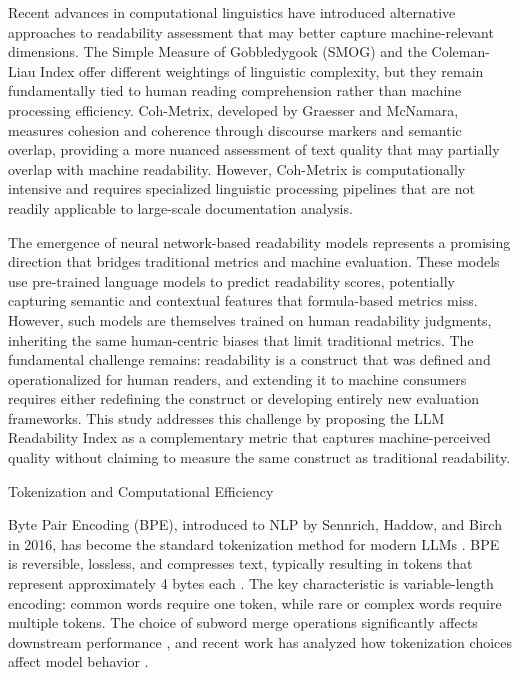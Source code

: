 \documentclass[10pt,conference,a4paper]{IEEEtran}
\makeatletter
\let\oldsubsection\subsection
\renewcommand{\subsection}{%
    \@ifstar{\subsectionStar}{\subsectionNoStar}%
}
\newcommand{\subsectionStar}[1]{%
    \oldsubsection*{\textit{#1}}%
    \vspace{-3pt}%
}
\newcommand{\subsectionNoStar}[1]{%
    \oldsubsection{\textit{#1}}%
    \vspace{-3pt}%
}
\makeatother
\begin{document}
Recent advances in computational linguistics have introduced alternative approaches to readability assessment that may better capture machine-relevant dimensions. The Simple Measure of Gobbledygook (SMOG) and the Coleman-Liau Index offer different weightings of linguistic complexity, but they remain fundamentally tied to human reading comprehension rather than machine processing efficiency. Coh-Metrix, developed by Graesser and McNamara, measures cohesion and coherence through discourse markers and semantic overlap, providing a more nuanced assessment of text quality that may partially overlap with machine readability. However, Coh-Metrix is computationally intensive and requires specialized linguistic processing pipelines that are not readily applicable to large-scale documentation analysis.

The emergence of neural network-based readability models represents a promising direction that bridges traditional metrics and machine evaluation. These models use pre-trained language models to predict readability scores, potentially capturing semantic and contextual features that formula-based metrics miss. However, such models are themselves trained on human readability judgments, inheriting the same human-centric biases that limit traditional metrics. The fundamental challenge remains: readability is a construct that was defined and operationalized for human readers, and extending it to machine consumers requires either redefining the construct or developing entirely new evaluation frameworks. This study addresses this challenge by proposing the LLM Readability Index as a complementary metric that captures machine-perceived quality without claiming to measure the same construct as traditional readability.

\subsection{Tokenization and Computational Efficiency}

Byte Pair Encoding (BPE), introduced to NLP by Sennrich, Haddow, and Birch in 2016, has become the standard tokenization method for modern LLMs \cite{Sennrich2016}. BPE is reversible, lossless, and compresses text, typically resulting in tokens that represent approximately 4 bytes each \cite{OpenAI2023}. The key characteristic is variable-length encoding: common words require one token, while rare or complex words require multiple tokens. The choice of subword merge operations significantly affects downstream performance \cite{Ding2019}, and recent work has analyzed how tokenization choices affect model behavior \cite{Ankner2024}.
\end{document}

